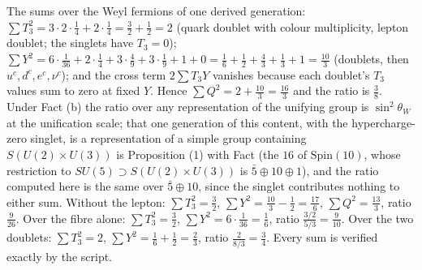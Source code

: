 The sums over the Weyl fermions of one derived generation: $\sum T_{3}^{2} = 3 \cdot 2 \cdot \tfrac14 + 2 \cdot \tfrac14 = \tfrac32 + \tfrac12 = 2$ (quark doublet with colour multiplicity, lepton doublet; the singlets have $T_{3} = 0$); $\sum Y^{2} = 6 \cdot \tfrac{1}{36} + 2 \cdot \tfrac14 + 3 \cdot \tfrac49 + 3 \cdot \tfrac19 + 1 + 0 = \tfrac16 + \tfrac12 + \tfrac43 + \tfrac13 + 1 = \tfrac{10}{3}$ (doublets, then $u^{c}, d^{c}, e^{c}, \nu^{c}$); and the cross term $2\sum T_{3}Y$ vanishes because each doublet's $T_{3}$ values sum to zero at fixed $Y$. Hence $\sum Q^{2} = 2 + \tfrac{10}{3} = \tfrac{16}{3}$ and the ratio is $\tfrac38$. Under Fact (b) the ratio over any representation of the unifying group is $\sin^{2}\theta_{W}$ at the unification scale; that one generation of this content, with the hypercharge-zero singlet, is a representation of a simple group containing $S(U(2) \times U(3))$ is Proposition (1) with Fact  (the $16$ of $\mathrm{Spin}(10)$, whose restriction to $SU(5) \supset S(U(2) \times U(3))$ is $\bar{5} \oplus 10 \oplus 1$), and the ratio computed here is the same over $\bar{5} \oplus 10$, since the singlet contributes nothing to either sum. Without the lepton: $\sum T_{3}^{2} = \tfrac32$, $\sum Y^{2} = \tfrac{10}{3} - \tfrac12 = \tfrac{17}{6}$, $\sum Q^{2} = \tfrac{13}{3}$, ratio $\tfrac{9}{26}$. Over the fibre alone: $\sum T_{3}^{2} = \tfrac32$, $\sum Y^{2} = 6 \cdot \tfrac{1}{36} = \tfrac16$, ratio $\tfrac{3/2}{5/3} = \tfrac{9}{10}$. Over the two doublets: $\sum T_{3}^{2} = 2$, $\sum Y^{2} = \tfrac16 + \tfrac12 = \tfrac23$, ratio $\tfrac{2}{8/3} = \tfrac34$. Every sum is verified exactly by the script.

